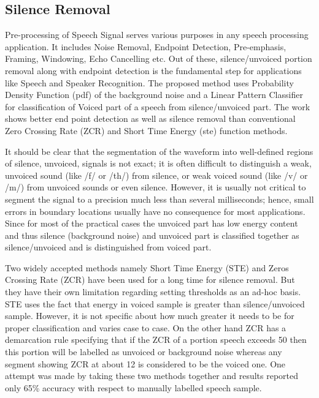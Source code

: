 \documentclass[12pt, a4paper, twoside]{report}
\begin{document}
\subsection{Silence Removal} 
Pre-processing of Speech Signal serves various purposes in any speech processing application. It includes Noise Removal, Endpoint Detection, Pre-emphasis, Framing, Windowing, Echo Cancelling etc. Out of these, silence/unvoiced portion removal along with endpoint detection is the fundamental step for applications like Speech and Speaker Recognition. The proposed method uses Probability Density Function (\acrshort{pdf}) of the background noise and a Linear Pattern Classifier for classification of Voiced part of a speech from silence/unvoiced part. The work shows better end point detection as well as silence removal than conventional Zero Crossing Rate (ZCR) and Short Time Energy (\acrshort{ste}) function methods.
\par
It should be clear that the segmentation of the waveform into well-defined regions of silence, unvoiced, signals is not exact; it is often difficult to distinguish a weak, unvoiced sound (like /f/ or /th/) from silence, or weak voiced sound (like /v/ or /m/) from unvoiced sounds or even silence. However, it is usually not critical to segment the signal to a precision much less than several milliseconds; hence, small errors in boundary locations usually have no consequence for most applications. Since for most of the practical cases the unvoiced part has low energy content and thus silence (background noise) and unvoiced part is classified together as silence/unvoiced and is distinguished from voiced part. 
\par
Two widely accepted methods namely Short Time Energy (STE) and Zeros Crossing Rate (ZCR) have been used for a long time for silence removal. But they have their own limitation regarding setting thresholds as an ad-hoc basis. STE uses the fact that energy in voiced sample is greater than silence/unvoiced sample. However, it is not specific about how much greater it needs to be for proper classification and varies case to case. On the other hand ZCR has a demarcation rule specifying that if the ZCR of a portion speech exceeds 50 then this portion will be labelled as unvoiced or background noise whereas any segment showing ZCR at about 12 is considered to be the voiced one. One attempt was made by taking these two methods together and results reported only 65\% accuracy with respect to manually labelled speech sample.
\par
\end{document}
